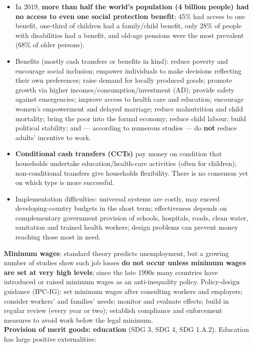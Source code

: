 \begin{itemize}
  \item In 2019, \textbf{more than half the world's population (4 billion people) had no access to even one social protection benefit}; 45\% had access to one benefit, one-third of children had a family/child benefit, only 28\% of people with disabilities had a benefit, and old-age pensions were the most prevalent (68\% of older persons).
  \item Benefits (mostly cash transfers or benefits in kind): reduce poverty and encourage social inclusion; empower individuals to make decisions reflecting their own preferences; raise demand for locally produced goods; promote growth via higher incomes/consumption/investment (AD); provide safety against emergencies; improve access to health care and education; encourage women's empowerment and delayed marriage; reduce malnutrition and child mortality; bring the poor into the formal economy; reduce child labour; build political stability; and --- according to numerous studies --- do \textbf{not} reduce adults' incentive to work.
  \item \textbf{Conditional cash transfers (CCTs)} pay money on condition that households undertake education/health-care activities (often for children); non-conditional transfers give households flexibility. There is no consensus yet on which type is more successful.
  \item Implementation difficulties: universal systems are costly, may exceed developing-country budgets in the short term; effectiveness depends on complementary government provision of schools, hospitals, roads, clean water, sanitation and trained health workers; design problems can prevent money reaching those most in need.
\end{itemize}
\textbf{Minimum wages}: standard theory predicts unemployment, but a growing number of studies show such job losses \textbf{do not occur unless minimum wages are set at very high levels}; since the late 1990s many countries have introduced or raised minimum wages as an anti-inequality policy. Policy-design guidance (IPC-IG): set minimum wages after consulting workers and employers; consider workers' and families' needs; monitor and evaluate effects; build in regular review (every year or two); establish compliance and enforcement measures to avoid work below the legal minimum.
\\
\textbf{Provision of merit goods: education} (SDG 3, SDG 4, SDG 1.A.2). Education has large positive externalities:
